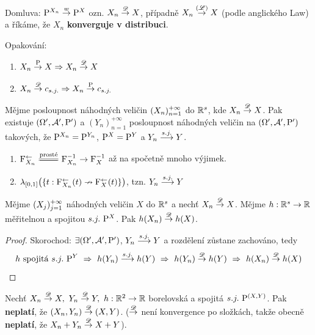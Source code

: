 \begin{define}
	Domluva: $\mathrm{P}^{X_n}\stackrel{w}{\to} \mathrm{P}^X$ ozn. $X_n \stackrel{\mathscr{D}}{\to} X$, případně $X_n\stackrel{(\mathscr{L})}{\to} X$ (podle anglického Law) a říkáme, že $X_n$ \textbf{konverguje v distribuci}.
\end{define}
\begin{remark}Opakování:
	\begin{enumerate}
		\item $X_n\stackrel{\mathrm{P}}{\to} X \Rightarrow X_n \stackrel{\mathscr{D}}{\to} X$
		\item $X_n \stackrel{\mathscr{D}}{\to} c_{s.j.}\Rightarrow X_n\stackrel{\mathrm{P}}{\to} c_{s.j.}$
	\end{enumerate}
\end{remark}
\begin{theorem}
	Mějme posloupnost náhodných veličin $(X_n)_{n=1}^{+\infty}$ do $\mathbb{R}^s$, kde $X_n\stackrel{\mathscr{D}}{\to} X$. Pak existuje $(\Omega',\mathcal{A}',\mathrm{P}')$ a $(Y_n)_{n=1}^{+\infty}$ posloupnost náhodných veličin na $(\Omega',\mathcal{A}',\mathrm{P}')$ takových, že $\mathrm{P}^{X_n}=\mathrm{P}^{Y_n}$, $\mathrm{P}^X=\mathrm{P}^Y$ a $Y_n\stackrel{s.j.}{\longrightarrow} Y$.
	 
\end{theorem}
\begin{remark}
	\begin{enumerate}
		\item $\FF_{X_n}^{\leftarrow}\equal{\text{prosté}}\FF_{X_n}^{-1}\to \FF_{X}^{-1}$ až na spočetně mnoho výjimek.
		\item$ \lambda_{[0,1]}\bigl( \{ t:\mathrm{F}_{X_n}^{\leftarrow}(t)\nrightarrow \mathrm{F}_{X}^{\leftarrow}(t) \} \bigr) $, tzn. $Y_n\stackrel{s.j.}{\longrightarrow} Y$
	\end{enumerate}
\end{remark}
\begin{theorem}
	Mějme $(X_j)_{j=1}^{+\infty}$ náhodných veličin $X$ do $\mathbb{R}^s$ a nechť $X_n\stackrel{\mathscr{D}}{\to} X$. Mějme $h:\mathbb{R}^s\to\mathbb{R}$ měřitelnou a spojitou $s.j.~\mathrm{P}^X$. Pak $h(X_n)\stackrel{\mathscr{D}}{\to} h(X)$.\begin{proof}
		 Skorochod: $\exists(\Omega',\mathcal{A}',\mathrm{P}')$, $Y_n\stackrel{s.j.}{\longrightarrow} Y$ a rozdělení zůstane zachováno, tedy 
		 $$ h\text{ spojitá }s.j.~\mathrm{P}^Y~\Rightarrow~h(Y_n)\stackrel{s.j.}{\longrightarrow} h(Y)~\Rightarrow~ h(Y_n)\stackrel{\mathscr{D}}{\to} h(Y)~\Rightarrow~ h(X_n)\stackrel{\mathscr{D}}{\to} h(X)  $$
	\end{proof}
\end{theorem}
\begin{dusl}
	Nechť $X_n\stackrel{\mathscr{D}}{\to} X,~Y_n\stackrel{\mathscr{D}}{\to} Y,~h:\mathbb{R}^2\to\mathbb{R}$ borelovská a spojitá $s.j.~\mathrm{P}^{(X,Y)}$. Pak \textbf{neplatí}, že $(X_n,Y_n)\stackrel{\mathscr{D}}{\to} (X,Y)$. ($\stackrel{\mathscr{D}}{\to}$ není konvergence po složkách, takže obecně \textbf{neplatí}, že $X_n+Y_n\stackrel{\mathscr{D}}{\to} X+Y$).
\end{dusl}
